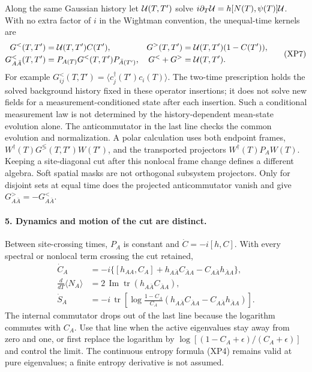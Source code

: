 \documentclass[11pt]{article}
\DeclareMathOperator{\tr}{tr}
\begin{document}
Along the same Gaussian history let ${\cal U}(T,T')$ solve
$i\partial_T{\cal U}=h[N(T),\psi(T)]{\cal U}$.  With no extra
factor of $i$ in the Wightman convention, the unequal-time kernels are
\begin{equation}
 \begin{aligned}
 G^<(T,T')&={\cal U}(T,T')C(T'),&
 G^>(T,T')&={\cal U}(T,T')(1-C(T')),\\
 G^<_{A\bar A}(T,T')&=P_{A(T)}G^<(T,T')P_{\bar A(T')},&
 G^<+G^>&={\cal U}(T,T').
 \end{aligned}\tag{XP7}
\end{equation}
For example $G^<_{ij}(T,T')=\langle c_j^\dagger(T')c_i(T)\rangle$.
The two-time prescription holds the solved background history
fixed in these operator insertions; it does not solve new fields
for a measurement-conditioned state after each insertion.
Such a conditional measurement law is not determined by
the history-dependent mean-state evolution alone.
The anticommutator in the last line checks the common evolution
and normalization.  A polar calculation uses both endpoint
frames, $W^\dagger(T)G^{\lessgtr}(T,T')W(T')$, and the
transported projectors $W^\dagger(T)P_AW(T)$.
Keeping a site-diagonal cut after this nonlocal frame change
defines a different algebra.  Soft spatial masks are not
orthogonal subsystem projectors.
Only for disjoint sets at equal time does the projected
anticommutator vanish and give $G^>_{A\bar A}=-G^<_{A\bar A}$.

\paragraph{5. Dynamics and motion of the cut are distinct.}
Between site-crossing times, $P_A$ is constant and
$\dot C=-i[h,C]$.  With every spectral or nonlocal term crossing
the cut retained,
\begin{equation}
 \begin{aligned}
 \dot C_A&=-i\{[h_{AA},C_A]+h_{A\bar A}C_{\bar A A}
                              -C_{A\bar A}h_{\bar A A}\},\\
 \frac{d}{dT}\langle N_A\rangle
     &=2\,\operatorname{Im}\tr(h_{A\bar A}C_{\bar A A}),\\
 \dot S_A&=-i\,\tr\!\left[
       \log\frac{1-C_A}{C_A}
       (h_{A\bar A}C_{\bar A A}-C_{A\bar A}h_{\bar A A})
                                      \right].
 \end{aligned}\tag{XP8}
\end{equation}
The internal commutator drops out of the last line because the
logarithm commutes with $C_A$.  Use that line when the active
eigenvalues stay away from zero and one, or first replace the
logarithm by $\log[(1-C_A+\epsilon)/(C_A+\epsilon)]$ and control
the limit.  The continuous entropy formula (XP4) remains valid
at pure eigenvalues; a finite entropy derivative is not assumed.
\end{document}
